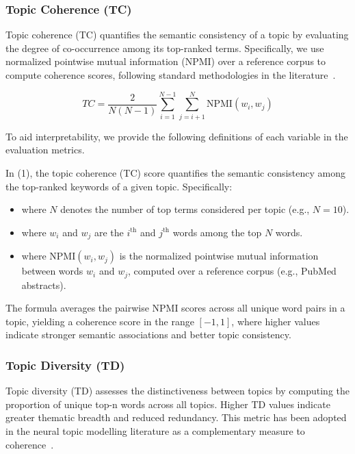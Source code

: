 \documentclass[authorproof,JACIII,researchpaper]{fujipressarticle}
\begin{document}
\subsubsection{Topic Coherence (TC)}

Topic coherence (TC) quantifies the semantic consistency of a topic by evaluating the degree of co-occurrence among its top-ranked terms. Specifically, we use normalized pointwise mutual information (NPMI) over a reference corpus to compute coherence scores, following standard methodologies in the literature~\cite{mimno_optimizing_2011,roder_exploring_2015}.

\begin{equation}
TC = \frac{2}{N(N-1)} \sum_{i=1}^{N-1} \sum_{j=i+1}^{N} \text{NPMI}(w_i, w_j)
\end{equation}

To aid interpretability, we provide the following definitions of each variable in the evaluation metrics.

In (1), the topic coherence (TC) score quantifies the semantic consistency among the top-ranked keywords of a given topic. Specifically:

\begin{itemize}
    \item where $N$ denotes the number of top terms considered per topic (e.g., $N = 10$).

    \item where $w_i$ and $w_j$ are the $i^{\text{th}}$ and $j^{\text{th}}$ words among the top $N$ words.

    \item where NPMI$(w_i, w_j)$ is the normalized pointwise mutual information between words $w_i$ and $w_j$, computed over a reference corpus (e.g., PubMed abstracts).
\end{itemize}

The formula averages the pairwise NPMI scores across all unique word pairs in a topic, yielding a coherence score in the range $[-1, 1]$, where higher values indicate stronger semantic associations and better topic consistency.

\subsubsection{Topic Diversity (TD)}

Topic diversity (TD) assesses the distinctiveness between topics by computing the proportion of unique top-n words across all topics. Higher TD values indicate greater thematic breadth and reduced redundancy. This metric has been adopted in the neural topic modelling literature as a complementary measure to coherence~\cite{dieng_topic_2020}.
\end{document}
